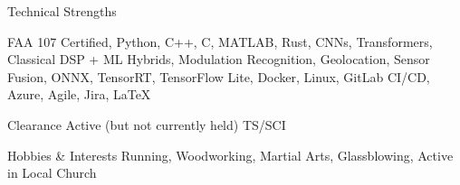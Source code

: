 \begin{rSection}{Technical Strengths}
\vspace{1pt}

FAA 107 Certified, Python, C++, C, MATLAB, Rust, CNNs, Transformers, Classical DSP + ML Hybrids,
Modulation Recognition, Geolocation, Sensor Fusion, ONNX, TensorRT,
TensorFlow Lite, Docker, Linux, GitLab CI/CD,
Azure, Agile, Jira, \LaTeX
\end{rSection}

\begin{rSection}{Clearance}
Active (but not currently held) TS/SCI
\end{rSection}

\begin{rSection}{Hobbies \& Interests}
Running, Woodworking, Martial Arts, Glassblowing, Active in Local Church
\end{rSection}


